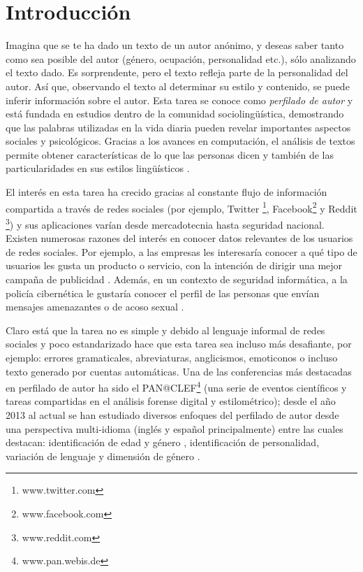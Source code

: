 \chapter{Introducción}

Imagina que se te ha dado un texto de un autor anónimo, y deseas saber tanto como sea posible del autor (género, ocupación, personalidad etc.), sólo analizando el texto dado. Es sorprendente, pero el texto refleja parte de la personalidad del autor. Así que, observando el texto al determinar su estilo y contenido, se puede inferir información sobre el autor. Esta tarea se conoce como \textit{perfilado de autor} y está fundada en estudios dentro de la comunidad sociolingüística, demostrando que las palabras utilizadas en la vida diaria pueden revelar importantes aspectos sociales y psicológicos. Gracias a los avances en computación, el análisis de textos permite obtener características de lo que las personas dicen y también de las particularidades en sus estilos lingüísticos \citep{Pennebaker2002}. 

El interés en esta tarea ha crecido gracias al constante flujo de información compartida a través de redes sociales (por ejemplo, Twitter \footnote{www.twitter.com}, Facebook\footnote{www.facebook.com} y Reddit \footnote{www.reddit.com}) y sus aplicaciones varían desde mercadotecnia hasta seguridad nacional. 
Existen numerosas razones del interés en conocer datos relevantes de los usuarios de redes sociales. Por ejemplo, a las empresas les interesaría conocer a qué tipo de usuarios les gusta un producto o servicio, con la intención de dirigir una mejor campaña de publicidad \citep{ikeda2013twitter}. Además, en un contexto de seguridad informática, a la policía cibernética le gustaría conocer el perfil de las personas que envían mensajes amenazantes o de acoso sexual \citep{bogdanova2012impact}.

Claro está que la tarea no es simple y debido al lenguaje informal de redes sociales y poco estandarizado hace que esta tarea sea incluso más desafiante, por ejemplo: errores gramaticales, abreviaturas, anglicismos, emoticonos o incluso texto generado por cuentas automáticas. Una de las conferencias más destacadas en perfilado de autor ha sido el PAN@CLEF\footnote{www.pan.webis.de} (una serie de eventos científicos y tareas compartidas en el análisis forense digital y estilométrico); desde el año 2013 al actual se han estudiado diversos enfoques del perfilado de autor desde una perspectiva multi-idioma (inglés y español principalmente) entre las cuales destacan: identificación de edad y género \citep{Rangel2013b}, identificación de personalidad, variación de lenguaje y dimensión de género \citep{Stammatatos2015}. 

